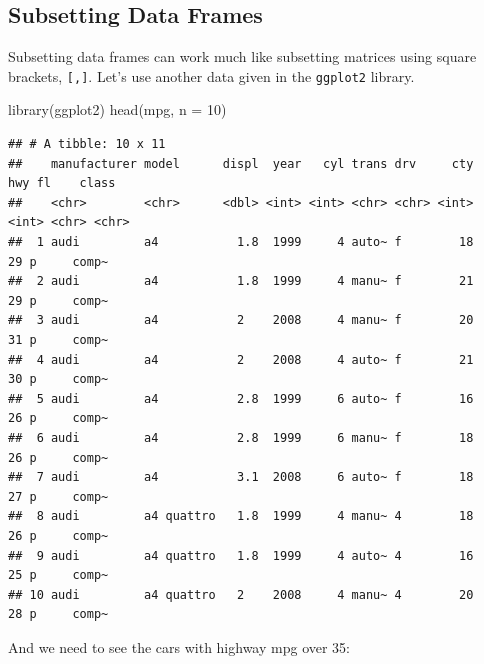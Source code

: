 \documentclass[
]{book}
\newenvironment{Shaded}{\begin{snugshade}}{\end{snugshade}}
\newcommand{\AttributeTok}[1]{\textcolor[rgb]{0.77,0.63,0.00}{#1}}
\newcommand{\DecValTok}[1]{\textcolor[rgb]{0.00,0.00,0.81}{#1}}
\newcommand{\FunctionTok}[1]{\textcolor[rgb]{0.00,0.00,0.00}{#1}}
\newcommand{\NormalTok}[1]{#1}
\newcommand{\SpecialCharTok}[1]{\textcolor[rgb]{0.00,0.00,0.00}{#1}}
\newcommand{\StringTok}[1]{\textcolor[rgb]{0.31,0.60,0.02}{#1}}
\theoremstyle{definition}
\theoremstyle{definition}
\theoremstyle{definition}
\theoremstyle{definition}
\theoremstyle{remark}
\begin{document}
\hypertarget{subsetting-data-frames}{%
\subsection{Subsetting Data Frames}\label{subsetting-data-frames}}

Subsetting data frames can work much like subsetting matrices using square brackets, \texttt{{[},{]}}. Let's use another data given in the \texttt{ggplot2} library.

\begin{Shaded}
\begin{Highlighting}[]
\FunctionTok{library}\NormalTok{(ggplot2)}
\FunctionTok{head}\NormalTok{(mpg, }\AttributeTok{n =} \DecValTok{10}\NormalTok{)}
\end{Highlighting}
\end{Shaded}

\begin{verbatim}
## # A tibble: 10 x 11
##    manufacturer model      displ  year   cyl trans drv     cty   hwy fl    class
##    <chr>        <chr>      <dbl> <int> <int> <chr> <chr> <int> <int> <chr> <chr>
##  1 audi         a4           1.8  1999     4 auto~ f        18    29 p     comp~
##  2 audi         a4           1.8  1999     4 manu~ f        21    29 p     comp~
##  3 audi         a4           2    2008     4 manu~ f        20    31 p     comp~
##  4 audi         a4           2    2008     4 auto~ f        21    30 p     comp~
##  5 audi         a4           2.8  1999     6 auto~ f        16    26 p     comp~
##  6 audi         a4           2.8  1999     6 manu~ f        18    26 p     comp~
##  7 audi         a4           3.1  2008     6 auto~ f        18    27 p     comp~
##  8 audi         a4 quattro   1.8  1999     4 manu~ 4        18    26 p     comp~
##  9 audi         a4 quattro   1.8  1999     4 auto~ 4        16    25 p     comp~
## 10 audi         a4 quattro   2    2008     4 manu~ 4        20    28 p     comp~
\end{verbatim}

And we need to see the cars with highway mpg over 35:

\begin{Shaded}
\end{Shaded}
\end{document}
